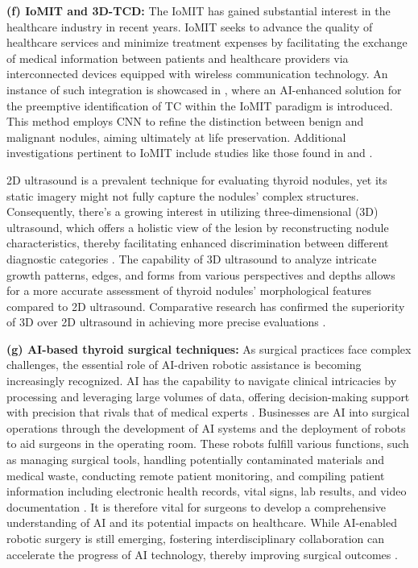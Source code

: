 \documentclass[a4paper,fleqn]{cas-sc}
\begin{document}
\vskip2mm
\noindent \textbf{(f) IoMIT and 3D-TCD:}  The \ac{IoMIT} has gained substantial interest in the healthcare industry in recent years. \ac{IoMIT} seeks to advance the quality of healthcare services and minimize treatment expenses by facilitating the exchange of medical information between patients and healthcare providers via interconnected devices equipped with wireless communication technology. An instance of such integration is showcased in \cite{ivanova2018artificial}, where an \ac{AI}-enhanced solution for the preemptive identification of TC within the \ac{IoMIT} paradigm is introduced. This method employs \ac{CNN} to refine the distinction between benign and malignant nodules, aiming ultimately at life preservation. Additional investigations pertinent to \ac{IoMIT} include studies like those found in \cite{borovska2018internet} and \cite{ivanova2017internet}.


2D ultrasound is a prevalent technique for evaluating thyroid nodules, yet its static imagery might not fully capture the nodules' complex structures. Consequently, there's a growing interest in utilizing three-dimensional (3D) ultrasound, which offers a holistic view of the lesion by reconstructing nodule characteristics, thereby facilitating enhanced discrimination between different diagnostic categories \cite{seifert2023optimization}. The capability of 3D ultrasound to analyze intricate growth patterns, edges, and forms from various perspectives and depths allows for a more accurate assessment of thyroid nodules' morphological features compared to 2D ultrasound. Comparative research has confirmed the superiority of 3D over 2D ultrasound in achieving more precise evaluations \cite{li2015comparison, lyshchik2004accuracy, ying2008two}.

\vskip2mm
\noindent \textbf{(g) AI-based thyroid surgical techniques: } As surgical practices face complex challenges, the essential role of AI-driven robotic assistance is becoming increasingly recognized. AI has the capability to navigate clinical intricacies by processing and leveraging large volumes of data, offering decision-making support with precision that rivals that of medical experts \cite{pakkasjarvi2023artificial}. Businesses are \ac{AI} into surgical operations through the development of AI systems and the deployment of robots to aid surgeons in the operating room. These robots fulfill various functions, such as managing surgical tools, handling potentially contaminated materials and medical waste, conducting remote patient monitoring, and compiling patient information including electronic health records, vital signs, lab results, and video documentation \cite{bodenstedt2020artificial}. It is therefore vital for surgeons to develop a comprehensive understanding of AI and its potential impacts on healthcare. While \ac{AI}-enabled robotic surgery is still emerging, fostering interdisciplinary collaboration can accelerate the progress of \ac{AI} technology, thereby improving surgical outcomes \cite{zhou2019artificial, zhou2020application, berikol2020artificial, tan2020part} \cite{habal2020brave, lee2020evaluation, voglis2020feasibility, navarrete2020current}.
\end{document}
